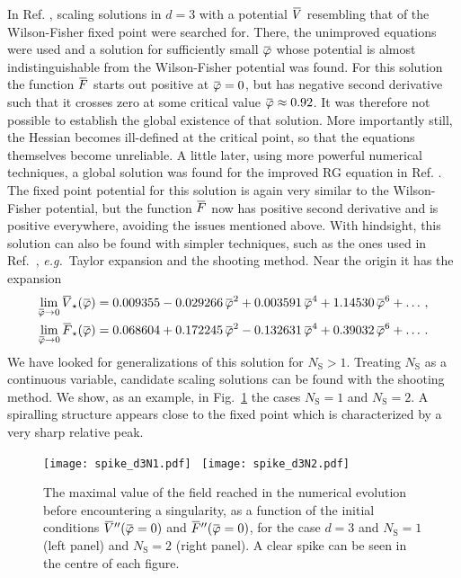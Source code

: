 \documentclass[11pt]{book}
\newcommand{\overbar}[1]{\mkern 1.5mu\overline{\mkern-1.5mu#1\mkern-1.5mu}\mkern 1.5mu}
\newcommand\NS{ N_{\scriptscriptstyle{\mathrm{S}}} }
\newcommand{\bV}{\overbar V}
\newcommand{\bF}{\overbar F}
\newcommand{\bVstar}{\bV_\star}
\newcommand{\bFstar}{\bF_\star}
\newcommand{\bp}{\overbar \varphi}
\newcommand\eg{\textit{e.g.}\ }
\numberwithin{equation}{chapter}
\begin{document}
In Ref. \cite{Percacci:2015wwa}, scaling solutions in $d=3$
with a potential $\bV$ resembling that of the Wilson-Fisher fixed point
were searched for.
There, the unimproved equations were used
and a solution for sufficiently small $\bp$
whose potential is almost indistinguishable from the
Wilson-Fisher potential was found. For this solution the function $\bF$
starts out positive at $\bp = 0$, but has negative
second derivative such that it crosses zero at
some critical value $\bp \approx 0.92$.
It was therefore not possible to establish the global existence of that solution.
More importantly still, the Hessian becomes ill-defined at the
critical point, so that the equations themselves become unreliable.
A little later, using more powerful numerical techniques,
a global solution was found for the improved RG equation in Ref. \cite{Borchardt:2015rxa}.
The fixed point potential for this solution is again
very similar to the Wilson-Fisher potential,
but the function $\bF$ now has positive second derivative
and is positive everywhere, avoiding the issues mentioned above.
With hindsight, this solution can also be found with
simpler techniques, such as the ones used in
Ref.~\cite{Percacci:2015wwa},
\eg Taylor expansion and the shooting method.
Near the origin it has the expansion
\begin{align}
  \lim_{\bp \rightarrow 0} \bVstar(\bp) &= 0.009355 - 0.029266 \, \bp ^2 + 0.003591 \, \bp ^4 + 1.14530 \, \bp ^6 + \dots \,, \\
  \lim_{\bp \rightarrow 0} \bFstar(\bp) &= 0.068604 + 0.172245 \, \bp ^2 - 0.132631 \, \bp ^4 + 0.39032 \, \bp ^6 + \dots \,.
\end{align}
We have looked for generalizations of this solution for $\NS>1$.
Treating $\NS$ as a continuous variable, candidate scaling solutions
can be found with the shooting method.
We show, as an example, in Fig.~\ref{WFN1N2} the cases $\NS=1$ and $\NS=2$.
A spiralling structure appears close to the fixed point which is characterized by a very sharp relative peak.
\begin{figure}
  \texttt{[image: spike\_d3N1.pdf]}
  \
  \texttt{[image: spike\_d3N2.pdf]}
  \caption{
    The maximal value of the field reached in the numerical
    evolution before encountering a singularity, as a function
    of the initial conditions $\bV''(\bp=0)$ and $\bF''(\bp=0)$,
    for the case $d=3$ and $\NS=1$ (left panel) and $\NS=2$ (right panel).
    A clear spike can be seen in the centre of each figure.
  }
  \label{WFN1N2}
\end{figure}
\end{document}
